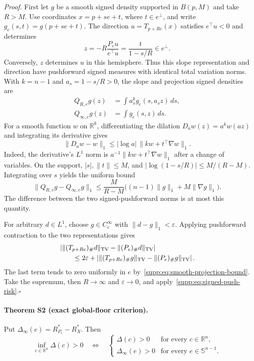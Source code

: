 \emph{Proof.}
First let $g$ be a smooth signed density supported in $B(p,M)$ and take $R>M$. Use coordinates $x=p+se+t$, where $t\in e^\perp$, and write $g_e(s,t)=g(p+se+t)$. The direction $u=T_{p+Re}(x)$ satisfies $e^\top u<0$ and determines
\[
 z=-R\frac{P_eu}{e^\top u}
   =\frac{t}{1-s/R}\in e^\perp.
\]
Conversely, $z$ determines $u$ in this hemisphere. Thus this slope representation and direction have pushforward signed measures with identical total variation norms. With $k=n-1$ and $a_s=1-s/R>0$, the slope and projection signed densities are
\begin{align*}
 Q_{R,e}g(z)&=\int a_s^k g_e(s,a_sz)\,ds,\\
 Q_{\infty,e}g(z)&=\int g_e(s,z)\,ds.
\end{align*}
For a smooth function $w$ on $\mathbb R^k$, differentiating the dilation $D_aw(z)=a^kw(az)$ and integrating its derivative gives
\[
 \|D_aw-w\|_1
 \leq |\log a|\,\|kw+t^\top\nabla w\|_1.
\]
Indeed, the derivative's $L^1$ norm is $a^{-1}\|kw+t^\top\nabla w\|_1$ after a change of variables. On the support, $|s|,\|t\|\leq M$, and
$|\log(1-s/R)|\leq M/(R-M)$. Integrating over $s$ yields the uniform bound
\begin{equation}
 \|Q_{R,e}g-Q_{\infty,e}g\|_1
 \leq\frac{M}{R-M}
 \bigl((n-1)\|g\|_1+M\|\nabla g\|_1\bigr).
 \label{supp:eq:smooth-projection-bound}
\end{equation}
The difference between the two signed-pushforward norms is at most this quantity.

For arbitrary $d\in L^1$, choose $g\in C_c^\infty$ with $\|d-g\|_1<\varepsilon$. Applying pushforward contraction to the two representations gives
\begin{align*}
 &\left|\|(T_{p+Re})_\#d\|_{\rm TV}
                  -\|(P_e)_\#d\|_{\rm TV}\right|\\
 &\qquad\leq 2\varepsilon
 +\left|\|(T_{p+Re})_\#g\|_{\rm TV}
                  -\|(P_e)_\#g\|_{\rm TV}\right|.
\end{align*}
The last term tends to zero uniformly in $e$ by~\eqref{supp:eq:smooth-projection-bound}. Take the supremum, then $R\to\infty$ and $\varepsilon\to0$, and apply~\eqref{supp:eq:signed-push-risk}.\hfill$\square$

\paragraph{Theorem S2 (exact global-floor criterion).}
Put $\Delta_\infty(e)=R^*_{P_e}-R_X^*$. Then
\begin{equation}
 \inf_{c\in\mathbb R^n}\Delta(c)>0
 \quad\Longleftrightarrow\quad
 \begin{cases}
 \Delta(c)>0&\text{for every }c\in\mathbb R^n,\\
 \Delta_\infty(e)>0&\text{for every }e\in\mathbb S^{n-1}.
 \end{cases}
 \label{supp:eq:global-criterion}
\end{equation}

